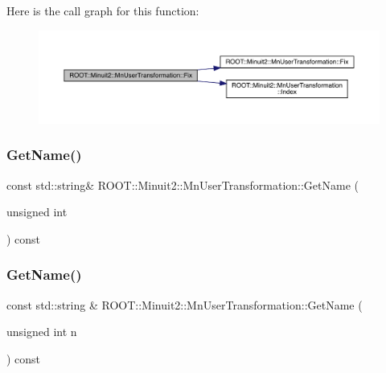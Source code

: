 Here is the call graph for this function\+:\nopagebreak
\begin{figure}[H]
\begin{center}
\leavevmode
\includegraphics[width=350pt]{d9/d98/classROOT_1_1Minuit2_1_1MnUserTransformation_ad01d6c104e0c4a26c2ebb34db0ba1752_cgraph}
\end{center}
\end{figure}
\mbox{\label{classROOT_1_1Minuit2_1_1MnUserTransformation_aa2b1548a49a6289914e4cde2fd40d780}} 
\subsubsection{\texorpdfstring{GetName()}{GetName()}\hspace{0.1cm}{\footnotesize\ttfamily [1/2]}}
{\footnotesize\ttfamily const std\+::string\& R\+O\+O\+T\+::\+Minuit2\+::\+Mn\+User\+Transformation\+::\+Get\+Name (\begin{DoxyParamCaption}\item[{unsigned int}]{ }\end{DoxyParamCaption}) const}

\mbox{\label{classROOT_1_1Minuit2_1_1MnUserTransformation_aa9cb2ec1cc12b7aec1160394bb95833d}} 
\subsubsection{\texorpdfstring{GetName()}{GetName()}\hspace{0.1cm}{\footnotesize\ttfamily [2/2]}}
{\footnotesize\ttfamily const std\+::string \& R\+O\+O\+T\+::\+Minuit2\+::\+Mn\+User\+Transformation\+::\+Get\+Name (\begin{DoxyParamCaption}\item[{unsigned int}]{n }\end{DoxyParamCaption}) const}

